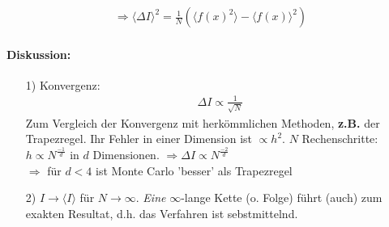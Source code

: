 \documentclass[12pt]{article}
\begin{document}
\begin{align*}
 \Rightarrow \langle \Delta I \rangle ^2= \frac{1}{N} \left( \langle f(x)^2 \rangle - \langle f(x) \rangle^2 \right)
\end{align*}
\paragraph{Diskussion:} \begin{itemize}
\item[1)] Konvergenz:
\begin{align}
\Delta I \propto \frac{1}{\sqrt{N}}
\end{align}
Zum Vergleich der Konvergenz mit herkömmlichen Methoden, \textbf{z.B.} der Trapezregel. Ihr Fehler in einer Dimension ist $\propto h^2 $. $N$ Rechenschritte: $h \propto N^{ \frac{-1}{d} }$ in $d$ Dimensionen. $\Rightarrow \Delta I \propto N^{\frac{-2}{d}}$\\
$ \Rightarrow$ für $d<4$ ist Monte Carlo 'besser' als Trapezregel

\item[2)] $I \to \langle I \rangle$ für $N \to \infty$. \textit{Eine} $\infty$-lange Kette (o. Folge) führt (auch) zum exakten Resultat, d.h. das Verfahren ist sebstmittelnd.


\end{itemize}
\end{document}
